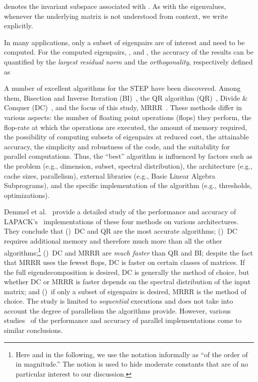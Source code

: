 \documentclass[final]{siamltex}
\begin{document}
denotes the invariant subspace associated with . As with the
eigenvalues, whenever the underlying matrix is not understood from context, we
write  explicitly.

In many applications, only a subset of eigenpairs are of interest and need
to be computed. 
For the computed eigenpairs,
,  and , the accuracy of the
results can be quantified by 
the {\it largest residual norm} and the {\it orthogonality}, 
respectively defined as 


A number of excellent algorithms for the STEP have been discovered. Among them,
Bisection and Inverse Iteration (BI)~\cite{Dhillon98currentinverse,Ipsen:1997:Invit},
the QR algorithm (QR)~\cite{qr61a,qr61b},  
Divide \& Conquer (DC)~\cite{dc81,dc94,dc95}, and the focus of this study,
MRRR~\cite{Dhillon:Diss,Dhillon:2004:Ortvecs,Dhillon:2004:MRRR,Fernando97,Parlett2000121,Willems:Diss}.  
These methods differ in various aspects: the number of floating point operations (flops)
they perform, the flop-rate at 
which the operations are executed, the amount of memory required, the
possibility of computing subsets 
of eigenpairs at reduced cost, the attainable accuracy, the simplicity and
robustness of the code, and the suitability for parallel computations.
Thus, the ``best'' algorithm is influenced by factors such as the problem
(e.g., dimension, subset, spectral distribution), the 
architecture (e.g., cache sizes, parallelism), external
libraries (e.g., Basic Linear Algebra Subprograms), and the specific
implementation of the algorithm (e.g., thresholds, optimizations). 

Demmel et al.~\cite{perf09} provide a detailed study of the performance and
accuracy of LAPACK's~\cite{laug} 
implementations of these four methods on various
architectures. They conclude that
()~DC and QR are the most accurate
algorithms; ()~DC requires  additional memory and therefore
much more than all 
the other algorithms;\footnote{Here and in the following, we use the notation
   informally as ``of the order of  in magnitude.'' The notion
is used to hide moderate constants that are of no particular interest to our
discussion.} ()~DC and MRRR are {\em much faster} than QR and BI;
despite the fact that MRRR uses the fewest flops, DC is faster on certain classes of
matrices. If the full eigendecomposition is desired, DC is generally the method of
choice, but whether DC or MRRR is faster depends on the spectral distribution
of the input matrix; and ()~if only a subset of eigenpairs is desired, 
MRRR is the method of choice. 
The study is limited to {\it sequential} executions and does not take
into account the degree of parallelism the algorithms provide. However, various
studies~\cite{Bientinesi:2005:PMR3,Vomel:2010:ScaLAPACKsMRRR,EleMRRR,Tisseur:1999:PDC,mr3smp} of the performance and 
accuracy of parallel implementations come to similar conclusions.
\end{document}
